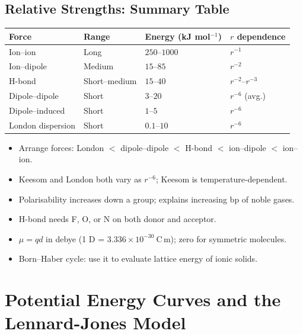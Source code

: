 \documentclass[12pt,a4paper]{article}
\begin{document}
\subsection{Relative Strengths: Summary Table}
\begin{tabularx}{\linewidth}{|B{2.8cm}|Y|Y|Y|}
\hline
\textbf{Force} & \textbf{Range} & \textbf{Energy (kJ mol$^{-1}$)} & \textbf{$r$ dependence} \\
\hline
Ion--ion & Long & $250$--$1000$ & $r^{-1}$ \\
\hline
Ion--dipole & Medium & $15$--$85$ & $r^{-2}$ \\
\hline
H-bond & Short--medium & $15$--$40$ & $r^{-2}$--$r^{-3}$ \\
\hline
Dipole--dipole & Short & $3$--$20$ & $r^{-6}$ (avg.) \\
\hline
Dipole--induced & Short & $1$--$5$ & $r^{-6}$ \\
\hline
London dispersion & Short & $0.1$--$10$ & $r^{-6}$ \\
\hline
\end{tabularx}

\begin{tcolorbox}[exambox, title={Exam Points (Section 1)}]
\begin{itemize}[leftmargin=*, itemsep=2pt, topsep=2pt]
  \item Arrange forces: London $<$ dipole--dipole $<$ H-bond $<$ ion--dipole $<$ ion--ion.
  \item Keesom and London both vary as $r^{-6}$; Keesom is temperature-dependent.
  \item Polarisability increases down a group; explains increasing bp of noble gases.
  \item H-bond needs F, O, or N on both donor and acceptor.
  \item $\mu = qd$ in debye (1 D = $3.336\times10^{-30}\ \mathrm{C\,m}$); zero for symmetric molecules.
  \item Born--Haber cycle: use it to evaluate lattice energy of ionic solids.
\end{itemize}
\end{tcolorbox}

\section{Potential Energy Curves and the Lennard-Jones Model}
\end{document}
